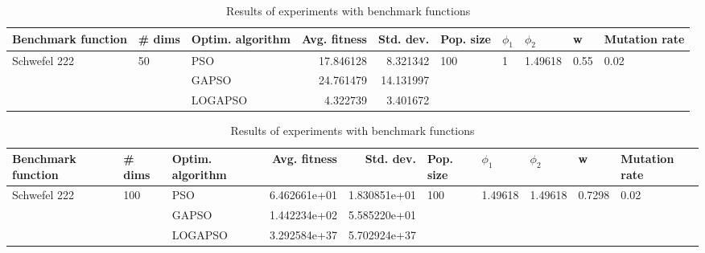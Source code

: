 \documentclass{article}
\begin{document}
\begin{table}
\centering
\caption{Results of experiments with benchmark functions}
\begin{tabular}{lllrrlllll}
\toprule
           Benchmark function &             \# dims & Optim. algorithm &  Avg. fitness &  Std. dev. &            Pop. size &         $\phi_{1}$ &               $\phi_{2}$ &                     w &         Mutation rate \\
\midrule
\multirow{3}{*}{Schwefel 222} & \multirow{3}{*}{50} &              PSO &     17.846128 &   8.321342 & \multirow{3}{*}{100} & \multirow{3}{*}{1} & \multirow{3}{*}{1.49618} & \multirow{3}{*}{0.55} & \multirow{3}{*}{0.02} \\
                              &                     &            GAPSO &     24.761479 &  14.131997 &                      &                    &                          &                       &                       \\
                              &                     &          LOGAPSO &      4.322739 &   3.401672 &                      &                    &                          &                       &                       \\
\bottomrule
\end{tabular}
\end{table}
\begin{table}
\centering
\caption{Results of experiments with benchmark functions}
\begin{tabular}{lllrrlllll}
\toprule
           Benchmark function &              \# dims & Optim. algorithm &  Avg. fitness &    Std. dev. &            Pop. size &               $\phi_{1}$ &               $\phi_{2}$ &                       w &         Mutation rate \\
\midrule
\multirow{3}{*}{Schwefel 222} & \multirow{3}{*}{100} &              PSO &  6.462661e+01 & 1.830851e+01 & \multirow{3}{*}{100} & \multirow{3}{*}{1.49618} & \multirow{3}{*}{1.49618} & \multirow{3}{*}{0.7298} & \multirow{3}{*}{0.02} \\
                              &                      &            GAPSO &  1.442234e+02 & 5.585220e+01 &                      &                          &                          &                         &                       \\
                              &                      &          LOGAPSO &  3.292584e+37 & 5.702924e+37 &                      &                          &                          &                         &                       \\
\bottomrule
\end{tabular}
\end{table}
\end{document}
